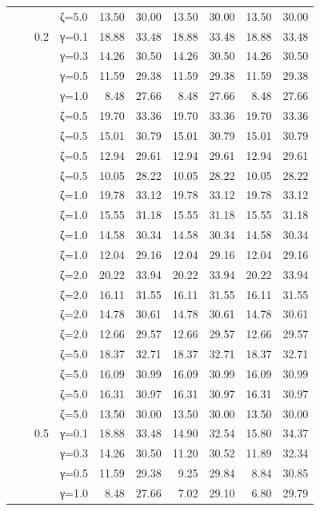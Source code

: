 \begin{table}[htbp]
\begin{tabular}{ll r l  rr  rr  rr}
  &  &  & ζ=5.0 & 13.50 & 30.00 & 13.50 & 30.00 & 13.50 & 30.00 \\
  &  & 0.2 & γ=0.1 & 18.88 & 33.48 & 18.88 & 33.48 & 18.88 & 33.48 \\
  &  &  & γ=0.3 & 14.26 & 30.50 & 14.26 & 30.50 & 14.26 & 30.50 \\
  &  &  & γ=0.5 & 11.59 & 29.38 & 11.59 & 29.38 & 11.59 & 29.38 \\
  &  &  & γ=1.0 & 8.48 & 27.66 & 8.48 & 27.66 & 8.48 & 27.66 \\
  &  &  & ζ=0.5 & 19.70 & 33.36 & 19.70 & 33.36 & 19.70 & 33.36 \\
  &  &  & ζ=0.5 & 15.01 & 30.79 & 15.01 & 30.79 & 15.01 & 30.79 \\
  &  &  & ζ=0.5 & 12.94 & 29.61 & 12.94 & 29.61 & 12.94 & 29.61 \\
  &  &  & ζ=0.5 & 10.05 & 28.22 & 10.05 & 28.22 & 10.05 & 28.22 \\
  &  &  & ζ=1.0 & 19.78 & 33.12 & 19.78 & 33.12 & 19.78 & 33.12 \\
  &  &  & ζ=1.0 & 15.55 & 31.18 & 15.55 & 31.18 & 15.55 & 31.18 \\
  &  &  & ζ=1.0 & 14.58 & 30.34 & 14.58 & 30.34 & 14.58 & 30.34 \\
  &  &  & ζ=1.0 & 12.04 & 29.16 & 12.04 & 29.16 & 12.04 & 29.16 \\
  &  &  & ζ=2.0 & 20.22 & 33.94 & 20.22 & 33.94 & 20.22 & 33.94 \\
  &  &  & ζ=2.0 & 16.11 & 31.55 & 16.11 & 31.55 & 16.11 & 31.55 \\
  &  &  & ζ=2.0 & 14.78 & 30.61 & 14.78 & 30.61 & 14.78 & 30.61 \\
  &  &  & ζ=2.0 & 12.66 & 29.57 & 12.66 & 29.57 & 12.66 & 29.57 \\
  &  &  & ζ=5.0 & 18.37 & 32.71 & 18.37 & 32.71 & 18.37 & 32.71 \\
  &  &  & ζ=5.0 & 16.09 & 30.99 & 16.09 & 30.99 & 16.09 & 30.99 \\
  &  &  & ζ=5.0 & 16.31 & 30.97 & 16.31 & 30.97 & 16.31 & 30.97 \\
  &  &  & ζ=5.0 & 13.50 & 30.00 & 13.50 & 30.00 & 13.50 & 30.00 \\
  &  & 0.5 & γ=0.1 & 18.88 & 33.48 & 14.90 & 32.54 & 15.80 & 34.37 \\
  &  &  & γ=0.3 & 14.26 & 30.50 & 11.20 & 30.52 & 11.89 & 32.34 \\
  &  &  & γ=0.5 & 11.59 & 29.38 & 9.25 & 29.84 & 8.84 & 30.85 \\
  &  &  & γ=1.0 & 8.48 & 27.66 & 7.02 & 29.10 & 6.80 & 29.79 \\

\end{tabular}
\end{table}
